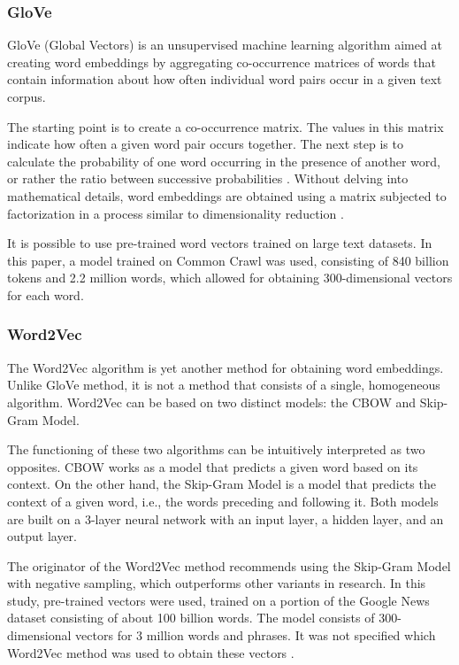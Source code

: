 \subsubsection{GloVe}
GloVe (Global Vectors) is an unsupervised machine learning algorithm aimed at creating word embeddings by aggregating co-occurrence matrices of words that contain information about how often individual word pairs occur in a given text corpus.

The starting point is to create a co-occurrence matrix. The values in this matrix indicate how often a given word pair occurs together. The next step is to calculate the probability of one word occurring in the presence of another word, or rather the ratio between successive probabilities \autocite{Pennington2014}. Without delving into mathematical details, word embeddings are obtained using a matrix subjected to factorization in a process similar to dimensionality reduction \autocite{Albrecht2020}.

It is possible to use pre-trained word vectors trained on large text datasets. In this paper, a model trained on Common Crawl was used, consisting of 840 billion tokens and 2.2 million words, which allowed for obtaining 300-dimensional vectors for each word.

\subsubsection{Word2Vec}
The Word2Vec algorithm is yet another method for obtaining word embeddings. Unlike GloVe method, it is not a method that consists of a single, homogeneous algorithm. Word2Vec can be based on two distinct models: the CBOW and Skip-Gram Model.

The functioning of these two algorithms can be intuitively interpreted as two opposites. CBOW works as a model that predicts a given word based on its context. On the other hand, the Skip-Gram Model is a model that predicts the context of a given word, i.e., the words preceding and following it. Both models are built on a 3-layer neural network with an input layer, a hidden layer, and an output layer.

The originator of the Word2Vec method recommends using the Skip-Gram Model with negative sampling, which outperforms other variants in research. In this study, pre-trained vectors were used, trained on a portion of the Google News dataset consisting of about 100 billion words. The model consists of 300-dimensional vectors for 3 million words and phrases. It was not specified which Word2Vec method was used to obtain these vectors \autocite{Mikolov2013}.

